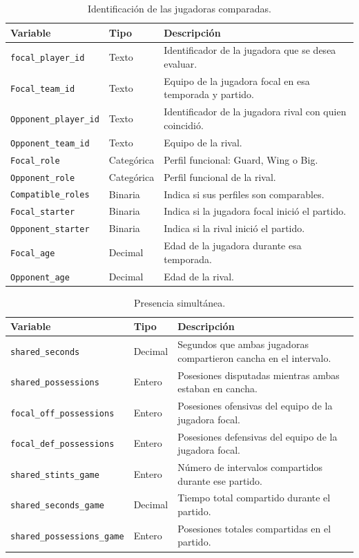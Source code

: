 \begin{longtable}{@{}p{3.5cm}p{1.9cm}p{7.3cm}@{}}
\caption{Identificación de las jugadoras comparadas.}\\
\toprule\textbf{Variable}&\textbf{Tipo}&\textbf{Descripción}\\\midrule\endhead
\texttt{focal\_player\_id}&Texto&Identificador de la jugadora que se desea evaluar.\\
\texttt{Focal\_team\_id}&Texto&Equipo de la jugadora focal en esa temporada y partido.\\
\texttt{Opponent\_player\_id}&Texto&Identificador de la jugadora rival con quien coincidió.\\
\texttt{Opponent\_team\_id}&Texto&Equipo de la rival.\\
\texttt{Focal\_role}&Categórica&Perfil funcional: Guard, Wing o Big.\\
\texttt{Opponent\_role}&Categórica&Perfil funcional de la rival.\\
\texttt{Compatible\_roles}&Binaria&Indica si sus perfiles son comparables.\\
\texttt{Focal\_starter}&Binaria&Indica si la jugadora focal inició el partido.\\
\texttt{Opponent\_starter}&Binaria&Indica si la rival inició el partido.\\
\texttt{Focal\_age}&Decimal&Edad de la jugadora durante esa temporada.\\
\texttt{Opponent\_age}&Decimal&Edad de la rival.\\
\bottomrule
\end{longtable}

\begin{longtable}{@{}p{4cm}p{1.8cm}p{6.9cm}@{}}
\caption{Presencia simultánea.}\\
\toprule\textbf{Variable}&\textbf{Tipo}&\textbf{Descripción}\\\midrule\endhead
\texttt{shared\_seconds}&Decimal&Segundos que ambas jugadoras compartieron cancha en el intervalo.\\
\texttt{shared\_possessions}&Entero&Posesiones disputadas mientras ambas estaban en cancha.\\
\texttt{focal\_off\_possessions}&Entero&Posesiones ofensivas del equipo de la jugadora focal.\\
\texttt{focal\_def\_possessions}&Entero&Posesiones defensivas del equipo de la jugadora focal.\\
\texttt{shared\_stints\_game}&Entero&Número de intervalos compartidos durante ese partido.\\
\texttt{shared\_seconds\_game}&Decimal&Tiempo total compartido durante el partido.\\
\texttt{shared\_possessions\_game}&Entero&Posesiones totales compartidas en el partido.\\
\bottomrule
\end{longtable}

